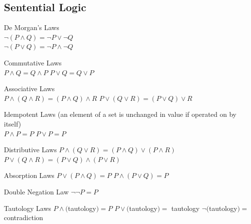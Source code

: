 \documentclass[12pt]{article}
\def\cBullet{\textbullet \quad} %
\begin{document}
	\subsection{Sentential Logic}
	De Morgan's Laws \\
	\textbullet \quad $ \lnot (P \land Q) = \lnot P \lor \lnot Q $ \\
	\textbullet \quad $ \lnot(P \lor Q) = \lnot P \land \lnot Q $

\begin{flushleft}
	
	Commutative Laws \\
	\cBullet $ P \land Q = Q \land P $ \linebreak
	\cBullet $ P \lor Q = Q \lor P $ \linebreak
	
	Associative Laws \\
	\cBullet $ P \land (Q \land R) = (P \land Q) \land R $ \linebreak
	\cBullet $ P \lor (Q \lor R) = (P \lor Q) \lor R $ \linebreak
	
	Idempotent Laws (an element of a set is unchanged in value if operated on by itself) \\
	\cBullet $ P \land P = P $ \linebreak
	\cBullet $ P \lor P = P $ \linebreak

	Distributive Laws \linebreak
	\textbullet \quad $ P  \land (Q \lor R) = (P \land Q) \lor (P \land R) $ \linebreak
	\textbullet \quad $ P \lor (Q \land R) = (P \lor Q) \land (P \lor R) $ \linebreak
	
	Absorption Laws \linebreak
	\textbullet \quad $ P \lor (P \land Q) = P $ \linebreak
	\textbullet \quad $ P \land (P \lor Q) = P $ \linebreak
	
	Double Negation Law \linebreak
	\textbullet \quad $ \lnot \lnot P = P $ \linebreak
	
	Tautology Laws \linebreak 
	\textbullet \quad $ P \land ($tautology$) = P $ \linebreak 
	\textbullet \quad $ P \lor ($tautology$) = $ tautology \linebreak
	\textbullet \quad $ \lnot ($tautology$) = $ contradiction \linebreak
	

\end{flushleft}
\end{document}
